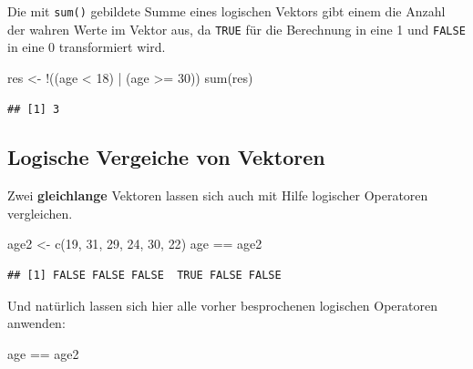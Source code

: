 \documentclass[
]{book}
\newenvironment{Shaded}{\begin{snugshade}}{\end{snugshade}}
\newcommand{\DecValTok}[1]{\textcolor[rgb]{0.00,0.00,0.81}{#1}}
\newcommand{\FunctionTok}[1]{\textcolor[rgb]{0.00,0.00,0.00}{#1}}
\newcommand{\NormalTok}[1]{#1}
\newcommand{\OtherTok}[1]{\textcolor[rgb]{0.56,0.35,0.01}{#1}}
\newcommand{\SpecialCharTok}[1]{\textcolor[rgb]{0.00,0.00,0.00}{#1}}
\begin{document}
Die mit \texttt{sum()} gebildete Summe eines logischen Vektors gibt einem die Anzahl der wahren Werte im Vektor aus, da \texttt{TRUE} für die Berechnung in eine 1 und \texttt{FALSE} in eine 0 transformiert wird.

\begin{Shaded}
\begin{Highlighting}[]
\NormalTok{res }\OtherTok{\textless{}{-}} \SpecialCharTok{!}\NormalTok{((age }\SpecialCharTok{\textless{}} \DecValTok{18}\NormalTok{) }\SpecialCharTok{|}\NormalTok{ (age }\SpecialCharTok{\textgreater{}=} \DecValTok{30}\NormalTok{))}
\FunctionTok{sum}\NormalTok{(res)}
\end{Highlighting}
\end{Shaded}

\begin{verbatim}
## [1] 3
\end{verbatim}

\hypertarget{logische-vergeiche-von-vektoren}{%
\subsection{Logische Vergeiche von Vektoren}\label{logische-vergeiche-von-vektoren}}

Zwei \textbf{gleichlange} Vektoren lassen sich auch mit Hilfe logischer Operatoren vergleichen.

\begin{Shaded}
\begin{Highlighting}[]
\NormalTok{age2 }\OtherTok{\textless{}{-}} \FunctionTok{c}\NormalTok{(}\DecValTok{19}\NormalTok{, }\DecValTok{31}\NormalTok{, }\DecValTok{29}\NormalTok{, }\DecValTok{24}\NormalTok{, }\DecValTok{30}\NormalTok{, }\DecValTok{22}\NormalTok{)}
\NormalTok{age }\SpecialCharTok{==}\NormalTok{ age2}
\end{Highlighting}
\end{Shaded}

\begin{verbatim}
## [1] FALSE FALSE FALSE  TRUE FALSE FALSE
\end{verbatim}

Und natürlich lassen sich hier alle vorher besprochenen logischen Operatoren anwenden:

\begin{Shaded}
\begin{Highlighting}[]
\NormalTok{age }\SpecialCharTok{==}\NormalTok{ age2 }
\end{Highlighting}
\end{Shaded}
\end{document}

